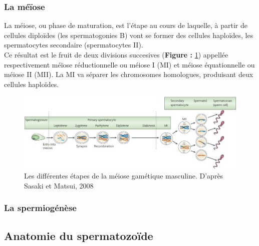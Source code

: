 \documentclass[12pt,twoside]{reedthesis}
\theoremstyle{definition}
\theoremstyle{definition}
\theoremstyle{remark}
\begin{document}
  \subsubsection{La méïose}\label{la-meiose}
  
  La méiose, ou phase de maturation, est l'étape au cours de laquelle, à
  partir de cellules diploïdes (les spermatogonies B) vont se former des
  cellules haploïdes, les spermatocytes secondaire (spermatocytes II).\\
  Ce résultat est le fruit de deux divisions succesives (\textbf{Figure :
  }\ref{fig:meiose}) appellée respectivement méïose réductionnelle ou
  méiose I (MI) et méiose équationnelle ou méiose II (MII). La MI va
  séparer les chromosomes homologues, produisant deux cellules haploïdes.
  
  \begin{figure}
  
  {\centering \includegraphics[scale=0.35]{figure/Meiosis_Stages} 
  
  }
  
  \caption{Les différentes étapes de la méiose gamétique masculine. D’après Sasaki et Matsui,
  2008}\label{fig:meiose}
  \end{figure}
  
  \subsubsection{La spermiogénèse}\label{la-spermiogenese}
  
  \subsection{Anatomie du spermatozoïde}\label{anatomie-du-spermatozoide}
  
\end{document}
